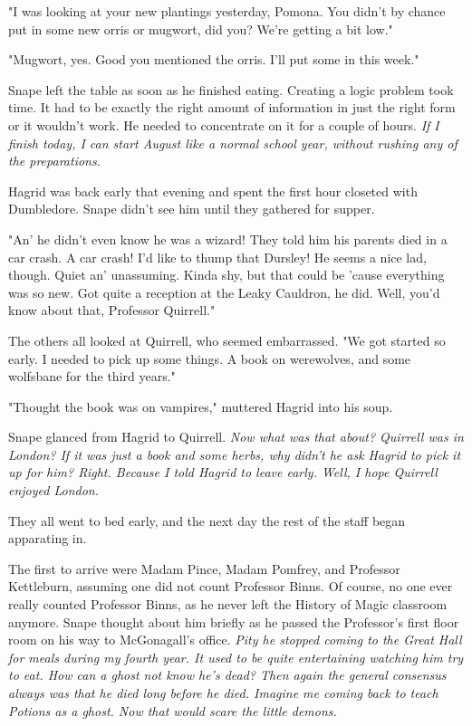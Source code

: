 "I was looking at your new plantings yesterday, Pomona. You didn't by chance put in some new orris or mugwort, did you? We're getting a bit low."

"Mugwort, yes. Good you mentioned the orris. I'll put some in this week."

Snape left the table as soon as he finished eating. Creating a logic problem took time. It had to be exactly the right amount of information in just the right form or it wouldn't work. He needed to concentrate on it for a couple of hours. \emph{If I finish today, I can start August like a normal school year, without rushing any of the preparations}.

Hagrid was back early that evening and spent the first hour closeted with Dumbledore. Snape didn't see him until they gathered for supper.

"An' he didn't even know he was a wizard! They told him his parents died in a car crash. A car crash! I'd like to thump that Dursley! He seems a nice lad, though. Quiet an' unassuming. Kinda shy, but that could be 'cause everything was so new. Got quite a reception at the Leaky Cauldron, he did. Well, you'd know about that, Professor Quirrell."

The others all looked at Quirrell, who seemed embarrassed. "We{\el} got started so early. I{\el} needed to{\el} pick up some things. A{\el} book on werewolves, and{\el} some wolfsbane for the{\el} third years."

"Thought the book was on vampires," muttered Hagrid into his soup.

Snape glanced from Hagrid to Quirrell. \emph{Now what was that about? Quirrell was in London? If it was just a book and some herbs, why didn't he ask Hagrid to pick it up for him? Right. Because I told Hagrid to leave early. Well, I hope Quirrell enjoyed London.}

They all went to bed early, and the next day the rest of the staff began apparating in.

The first to arrive were Madam Pince, Madam Pomfrey, and Professor Kettleburn, assuming one did not count Professor Binns. Of course, no one ever really counted Professor Binns, as he never left the History of Magic classroom anymore. Snape thought about him briefly as he passed the Professor's first floor room on his way to McGonagall's office. \emph{Pity he stopped coming to the Great Hall for meals during my fourth year. It used to be quite entertaining watching him try to eat. How can a ghost not know he's dead? Then again the general consensus always was that he died long before he died. Imagine me coming back to teach Potions as a ghost. Now that would scare the little demons.}

